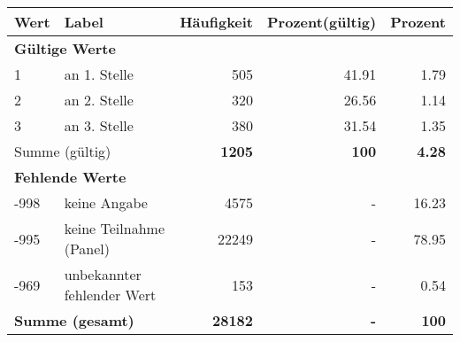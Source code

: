      \begin{longtable}{lXrrr}
     \toprule
     \textbf{Wert} & \textbf{Label} & \textbf{Häufigkeit} & \textbf{Prozent(gültig)} & \textbf{Prozent} \\
     \endhead
     \midrule
     \multicolumn{5}{l}{\textbf{Gültige Werte}}\\

     1 &
     \multicolumn{1}{X}{ an 1. Stelle   } &


       \num{505} &
       \num[round-mode=places,round-precision=2]{41.91} &
         \num[round-mode=places,round-precision=2]{1.79} \\

     2 &
     \multicolumn{1}{X}{ an 2. Stelle   } &


       \num{320} &
       \num[round-mode=places,round-precision=2]{26.56} &
         \num[round-mode=places,round-precision=2]{1.14} \\

     3 &
     \multicolumn{1}{X}{ an 3. Stelle   } &


       \num{380} &
       \num[round-mode=places,round-precision=2]{31.54} &
         \num[round-mode=places,round-precision=2]{1.35} \\
     \midrule
     \multicolumn{2}{l}{Summe (gültig)} &
       \textbf{\num{1205}} &
     \textbf{100} &
       \textbf{\num[round-mode=places,round-precision=2]{4.28}} \\
     \multicolumn{5}{l}{\textbf{Fehlende Werte}}\\
       -998 &
       keine Angabe &
         \num{4575} &
        - &
         \num[round-mode=places,round-precision=2]{16.23} \\
       -995 &
       keine Teilnahme (Panel) &
         \num{22249} &
        - &
         \num[round-mode=places,round-precision=2]{78.95} \\
       -969 &
       unbekannter fehlender Wert &
         \num{153} &
        - &
         \num[round-mode=places,round-precision=2]{0.54} \\
     \midrule
     \multicolumn{2}{l}{\textbf{Summe (gesamt)}} &
          \textbf{\num{28182}} &
        \textbf{-} &
        \textbf{100} \\
     \bottomrule
     \end{longtable}
     
